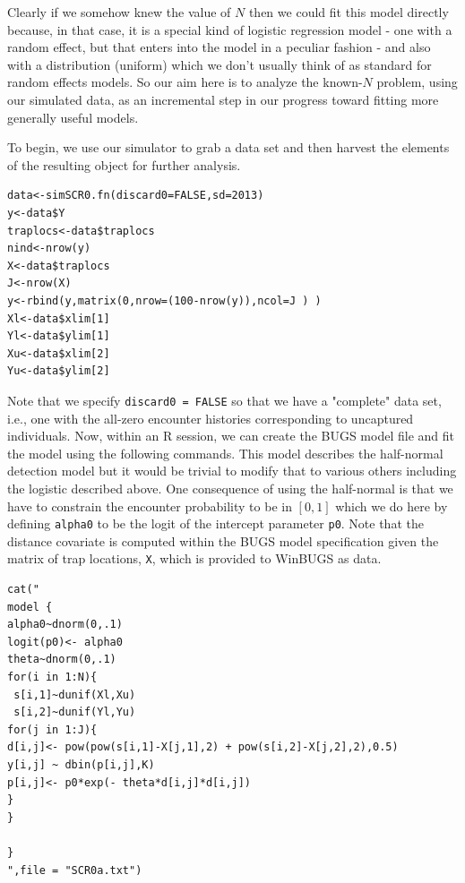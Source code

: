 Clearly if we somehow knew the value of $N$ then we could fit this
model directly because, in that case, it is a special kind of logistic
regression model - one with a random effect, but that enters into the
model in a peculiar fashion - and also with a distribution (uniform)
which we don't usually think of as standard for random effects models.
So our aim here is to analyze the known-$N$ problem, using our simulated
data, as an incremental step in our progress toward fitting more
generally useful models.

To begin, we use our simulator to grab a data set and then harvest the
elements of the resulting object for further analysis.
\begin{verbatim}
data<-simSCR0.fn(discard0=FALSE,sd=2013)
y<-data$Y
traplocs<-data$traplocs
nind<-nrow(y)
X<-data$traplocs
J<-nrow(X)
y<-rbind(y,matrix(0,nrow=(100-nrow(y)),ncol=J ) )
Xl<-data$xlim[1]
Yl<-data$ylim[1]
Xu<-data$xlim[2]
Yu<-data$ylim[2]
\end{verbatim}

Note that we specify \mbox{\tt discard0 = FALSE} so that we have a
"complete" data set, i.e., one with the all-zero encounter histories
corresponding to uncaptured individuals. Now, within an R session, we
can create the BUGS model file and fit the model using the following
commands. This model describes the half-normal detection model but it
would be trivial to modify that to various others including the
logistic described above. One consequence of using the half-normal is
that we have to constrain the encounter probability to be in $[0,1]$
which we do here by defining \mbox{\tt alpha0} to be the logit of the
intercept parameter \mbox{\tt p0}. Note that the distance covariate is
computed within the BUGS model specification given the matrix of trap
locations, \mbox{\tt X}, which is provided to WinBUGS as data.
{\small 
\begin{verbatim}
cat("
model {
alpha0~dnorm(0,.1)
logit(p0)<- alpha0
theta~dnorm(0,.1)
for(i in 1:N){
 s[i,1]~dunif(Xl,Xu)
 s[i,2]~dunif(Yl,Yu) 
for(j in 1:J){
d[i,j]<- pow(pow(s[i,1]-X[j,1],2) + pow(s[i,2]-X[j,2],2),0.5)
y[i,j] ~ dbin(p[i,j],K)
p[i,j]<- p0*exp(- theta*d[i,j]*d[i,j])
}
}

}
",file = "SCR0a.txt")
\end{verbatim}
}

